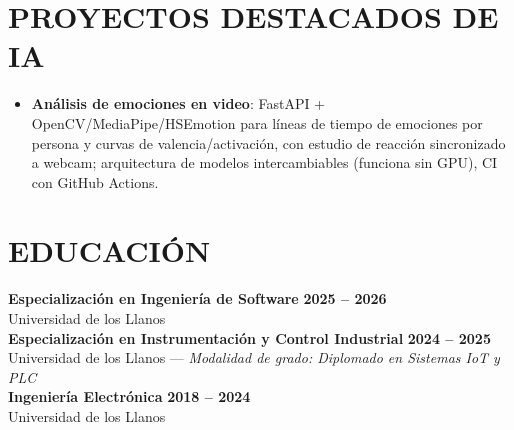 \documentclass[letterpaper,10pt]{article}
\begin{document}
\section{PROYECTOS DESTACADOS DE IA}
\begin{itemize}
    \item \textbf{Análisis de emociones en video}: FastAPI + OpenCV/MediaPipe/HSEmotion para líneas de tiempo de emociones por persona y curvas de valencia/activación, con estudio de reacción sincronizado a webcam; arquitectura de modelos intercambiables (funciona sin GPU), CI con GitHub Actions.
\end{itemize}

\section{EDUCACIÓN}
\textbf{Especialización en Ingeniería de Software} \hfill \textbf{2025 -- 2026} \\
Universidad de los Llanos \\
\textbf{Especialización en Instrumentación y Control Industrial} \hfill \textbf{2024 -- 2025} \\
Universidad de los Llanos --- \textit{Modalidad de grado: Diplomado en Sistemas IoT y PLC} \\
\textbf{Ingeniería Electrónica} \hfill \textbf{2018 -- 2024} \\
Universidad de los Llanos
\end{document}
